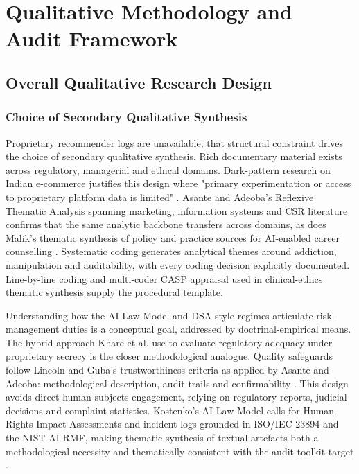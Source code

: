 \documentclass[11pt]{article}
\begin{document}
\section{Qualitative Methodology and Audit Framework}

\subsection{Overall Qualitative Research Design}

\subsubsection{Choice of Secondary Qualitative Synthesis}
\label{sec:choice_secondary_synthesis} Proprietary recommender logs are unavailable; that structural constraint drives the choice of secondary qualitative synthesis. Rich documentary material exists across regulatory, managerial and ethical domains. Dark-pattern research on Indian e-commerce justifies this design where "primary experimentation or access to proprietary platform data is limited" \parencites[6]{6295677}. Asante and Adeoba's Reflexive Thematic Analysis spanning marketing, information systems and CSR literature \parencites[8]{8200246}[10]{8200246} confirms that the same analytic backbone transfers across domains, as does Malik's thematic synthesis of policy and practice sources for AI-enabled career counselling \parencites{9762591}. Systematic coding generates analytical themes around addiction, manipulation and auditability, with every coding decision explicitly documented. Line-by-line coding and multi-coder CASP appraisal used in clinical-ethics thematic synthesis \parencites[7]{6419865} supply the procedural template.

Understanding how the AI Law Model and DSA-style regimes articulate risk-management duties is a conceptual goal, addressed by doctrinal-empirical means. The hybrid approach Khare et al. \parencites[6]{6295677} use to evaluate regulatory adequacy under proprietary secrecy is the closer methodological analogue. Quality safeguards follow Lincoln and Guba's trustworthiness criteria as applied by Asante and Adeoba: methodological description, audit trails and confirmability \parencites[10]{8200246}. This design avoids direct human-subjects engagement, relying on regulatory reports, judicial decisions and complaint statistics. Kostenko's AI Law Model \parencites[54]{2977039} calls for Human Rights Impact Assessments and incident logs grounded in ISO/IEC 23894 and the NIST AI RMF, making thematic synthesis of textual artefacts both a methodological necessity and thematically consistent with the audit-toolkit target \parencites[12]{2977039}[23]{6839355}.
\end{document}
